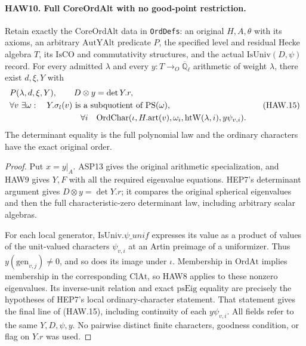 \documentclass[11pt,a4paper]{article}
\numberwithin{equation}{section}
\theoremstyle{remark}\newtheorem{remark}[theorem]{Remark}
\begin{document}
\paragraph{HAW10. Full CoreOrdAlt with no good-point restriction.}
\label{claim:HAW10}
Retain exactly the $\mathrm{CoreOrdAlt}$ data in
\texttt{Ord\allowbreak Defs}: an original $H,A,\theta$ with its axioms,
an arbitrary $\mathrm{AutYAlt}$ predicate $P$, the specified
level and residual Hecke algebra $T$, its $\mathrm{IsCO}$
and commutativity structures, and the actual
$\mathrm{IsUniv}(D,\psi)$ record.  For every admitted
$\lambda$ and every $y:T\to_O\overline{\mathbb Q}_\ell$
arithmetic of weight $\lambda$, there exist $d,\xi,Y$ with
\[
 \begin{split}
 &P(\lambda,d,\xi,Y),\qquad D\otimes y=\det Y.r,\\
 &\forall v\ \exists\omega:\quad
 Y.\sigma_l(v)\text{ is a subquotient of }\mathrm{PS}(\omega),\\
 &\hspace{30mm}\forall i\quad
 \mathrm{OrdChar}(\iota,H.\mathrm{art}(v),\omega_i,
                       \mathrm{htW}(\lambda,i),y\psi_{v,i}).
 \end{split}
 \tag{HAW.15}
\]
The determinant equality is the full polynomial law and the
ordinary characters have the exact original order.
\begin{proof}
Put $x=y|_A$.  ASP13 gives the original arithmetic
specialization, and HAW9 gives $Y,F$ with all the required
eigenvalue equations.  HEP7's determinant argument gives
$D\otimes y=\det Y.r$; it compares the original spherical
eigenvalues and then the full characteristic-zero determinant
law, including arbitrary scalar algebras.

For each local generator, $\mathrm{IsUniv}.\psi\_\allowbreak unif$
expresses its value as a product of values of the unit-valued
characters $\psi_{v,i}$ at an Artin preimage of a uniformizer.
Thus $y(\mathrm{gen}_{v,j})\ne0$, and so does its image
under $\iota$.  Membership in $\mathrm{OrdAt}$ implies
membership in the corresponding $\mathrm{ClAt}$, so HAW8
applies to these nonzero eigenvalues.  Its inverse-unit
relation and exact $\mathrm{psEig}$ equality are precisely
the hypotheses of HEP7's local ordinary-character statement.
That statement gives the final line of (HAW.15), including
continuity of each $y\psi_{v,i}$.  All fields refer to the
same $Y,D,\psi,y$.  No pairwise distinct finite characters,
goodness condition, or flag on $Y.r$ was used.
\end{proof}
\end{document}
